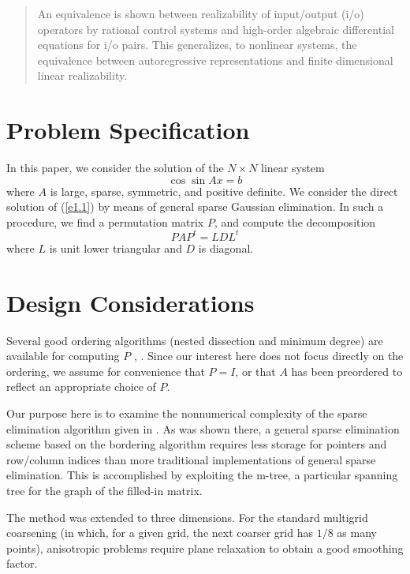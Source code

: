 
\begin{abstract}An equivalence is shown between realizability of input/output (i/o) operators by
rational control systems and high-order algebraic differential equations for
i/o pairs.  This generalizes, to nonlinear systems, the equivalence
between autoregressive representations and finite dimensional linear
realizability. \end{abstract}
\section{Problem Specification}In this paper, we consider the solution of the $N \times
N$ linear
system
\begin{equation} \label{e1.1}
\cos \sin A x = b
\end{equation}
where $A$ is large, sparse, symmetric, and positive definite.  We consider
the direct solution of (\ref{e1.1}) by means of general sparse Gaussian
elimination.  In such a procedure, we find a permutation matrix $P$, and
compute the decomposition
\[
P A P^{t} = L D L^{t}
\]
where $L$ is unit lower triangular and $D$ is diagonal.  

 
\section{Design Considerations}Several good ordering algorithms (nested dissection and
minimum degree)
are available for computing $P$  \cite{GEORGELIU}, \cite{ROSE72}.
Since our interest here does not
focus directly on the ordering, we assume for convenience that $P=I$,
or that $A$ has been preordered to reflect an appropriate choice of $P$.

Our purpose here is to examine the nonnumerical complexity of the
sparse elimination algorithm given in  \cite{BANKSMITH}.
As was shown there, a general sparse elimination scheme based on the
bordering algorithm requires less storage for pointers and
row/column indices than more traditional implementations of general
sparse elimination.  This is accomplished by exploiting the m-tree,
a particular spanning tree for the graph of the filled-in matrix.

\begin{theorem} The method  was extended to three
dimensions. For the standard multigrid
coarsening
(in which, for a given grid, the next coarser grid has $1/8$
as many points), anisotropic problems require plane
relaxation to
obtain a good smoothing factor.\end{theorem} 

